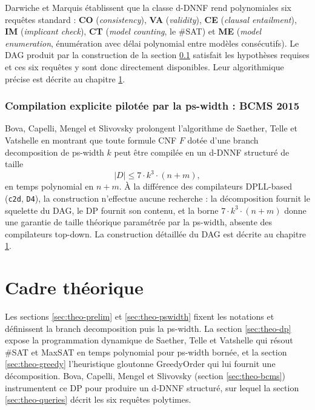 \documentclass[11pt,a4paper]{report}
\theoremstyle{plain}
\theoremstyle{definition}
\begin{document}
Darwiche et Marquis \cite{darwiche2002} établissent que la classe d-DNNF
rend polynomiales six requêtes standard : \textbf{CO}
(\emph{consistency}), \textbf{VA} (\emph{validity}), \textbf{CE}
(\emph{clausal entailment}), \textbf{IM} (\emph{implicant check}),
\textbf{CT} (\emph{model counting}, le \#SAT) et \textbf{ME}
(\emph{model enumeration}, énumération avec délai polynomial entre
modèles consécutifs). Le DAG produit par la construction de la
section \ref{subsec:bcms} satisfait les hypothèses requises et ces
six requêtes y sont donc directement disponibles. Leur algorithmique
précise est décrite au chapitre \ref{chap:theorie}.

\subsection{Compilation explicite pilotée par la ps-width : BCMS 2015}
\label{subsec:bcms}

Bova, Capelli, Mengel et Slivovsky \cite{bova2015} prolongent
l'algorithme de Saether, Telle et Vatshelle en montrant que toute formule
CNF $F$ dotée d'une branch decomposition de ps-width $k$ peut être
compilée en un d-DNNF structuré de taille
\[
  |D| \leq 7 \cdot k^3 \cdot (n + m),
\]
en temps polynomial en $n + m$. À la différence des compilateurs
DPLL-based (\texttt{c2d}, \texttt{D4}), la construction n'effectue
aucune recherche : la décomposition fournit le squelette du DAG, le DP
fournit son contenu, et la borne $7 \cdot k^3 \cdot (n+m)$ donne une
garantie de taille théorique paramétrée par la ps-width, absente des
compilateurs top-down. La construction détaillée du DAG est décrite au
chapitre \ref{chap:theorie}.


\chapter{Cadre théorique}
\label{chap:theorie}

Les sections \ref{sec:theo-prelim} et \ref{sec:theo-pswidth} fixent les
notations et définissent la branch decomposition puis la ps-width. La
section \ref{sec:theo-dp} expose la programmation dynamique de Saether,
Telle et Vatshelle \cite{saether2015} qui résout \#SAT et MaxSAT en
temps polynomial pour ps-width bornée, et la section \ref{sec:theo-greedy}
l'heuristique gloutonne GreedyOrder qui lui fournit une décomposition.
Bova, Capelli, Mengel et Slivovsky \cite{bova2015}
(section \ref{sec:theo-bcms}) instrumentent ce DP pour produire un
d-DNNF structuré, sur lequel la section \ref{sec:theo-queries} décrit
les six requêtes polytimes.
\end{document}
